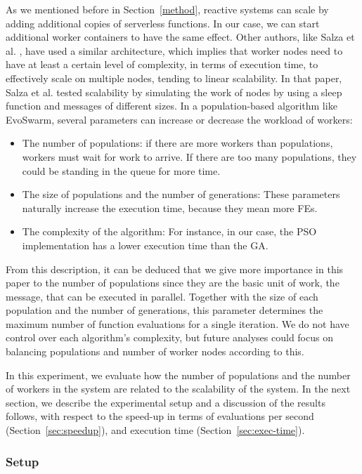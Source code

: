 \documentclass[review]{elsarticle}
\begin{document}
As we mentioned before in Section~\ref{method}, reactive systems can scale by adding additional copies
of serverless functions. In our case, we can start additional worker containers
to have the same effect. Other authors, like Salza et al. \cite{salza2019speed},
have used a similar architecture, which implies that worker nodes need to have at least a certain level
of complexity, in terms of execution time,  to effectively scale on multiple
nodes, tending to linear scalability. In that paper, Salza et al. tested scalability
by simulating the work of nodes by using a sleep function and messages of different sizes.
In a population-based algorithm like EvoSwarm, several parameters can increase or 
decrease the workload of workers:

\begin{itemize}
    \item The number of populations: if there are more workers than populations, workers
    must wait for work to arrive. If there are too many populations, they could be
    standing in the queue for more time.
    \item The size of populations and the number of generations:
    These parameters naturally increase the execution time, because they mean more FEs.
    \item The complexity of the algorithm: For instance, in our case,
    the PSO implementation has a lower execution time than the GA.
\end{itemize}




From this description, it can be deduced that we give more importance in this
paper to the number of populations since they are the basic unit of
work, the message, that
can be executed in parallel. Together with the size of each population and the
number of generations, this parameter determines the maximum number of function
evaluations for a single iteration. We do not have control over each algorithm's
complexity, but future analyses could focus on balancing populations and number
of worker nodes according to this.

In this experiment, we evaluate how the number of populations and the
number of workers in the system are related to the scalability of the
system.  In the next section, we describe the experimental setup and a
discussion of the results follows, with respect to the speed-up in
terms of evaluations per second (Section~\ref{sec:speedup}), and
execution time (Section~\ref{sec:exec-time}).

\subsubsection{Setup} %
\end{document}
